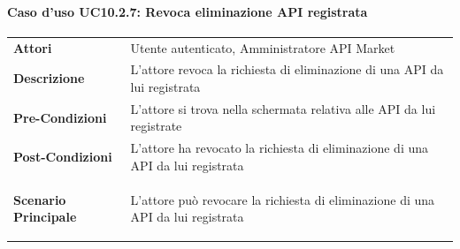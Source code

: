 \paragraph{Caso d'uso UC10.2.7: Revoca eliminazione API registrata}
\label{UC10_2_7}

\begin{minipage}{\linewidth}
	\begin{tabular}{ l | p{11cm}}
		\hline
		\rowcolor{Gray}
		\multicolumn{2}{c}{UC10.2.7 - Revoca eliminazione API registrata} \\
		\hline
		\textbf{Attori} & Utente autenticato, Amministratore API Market \\
		\textbf{Descrizione} & L'attore revoca la richiesta di eliminazione di una API da lui registrata \\
		\textbf{Pre-Condizioni} & L'attore si trova nella schermata relativa alle API da lui registrate \\
		\textbf{Post-Condizioni} & L'attore ha revocato la richiesta di eliminazione di una API da lui registrata \\
		\textbf{Scenario Principale} & 
		\begin{enumerate*}[label=(\arabic*.),itemjoin={\newline}]
			\item L'attore può revocare la richiesta di eliminazione di una API da lui registrata
		\end{enumerate*}\\
	\end{tabular}
\end{minipage}